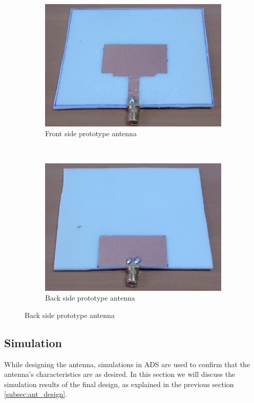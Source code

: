 \documentclass[a4paper]{article}        %
\begin{document}
	\begin{figure}[H]
	\centering
	\begin{subfigure}[b]{0.52\textwidth}
                \includegraphics[width=\textwidth]{images/patch_proto_front}
                \caption{Front side prototype antenna}
                \label{fig:front_prototype}
        \end{subfigure}%
  ~      
        \begin{subfigure}[b]{0.5\textwidth}
                \includegraphics[width=\textwidth]{images/patch_proto_back}
                \caption{Back side prototype antenna}
                \label{fig:back_prototype}
        \end{subfigure}
	\end{figure}

	\subsection{Simulation}
		While designing the antenna, simulations in ADS are used to confirm that the antenna's characteristics are as desired. In this section we will discuss the simulation results of the final design, as explained in the previous section \ref{subsec:ant_design}. 
\end{document}
